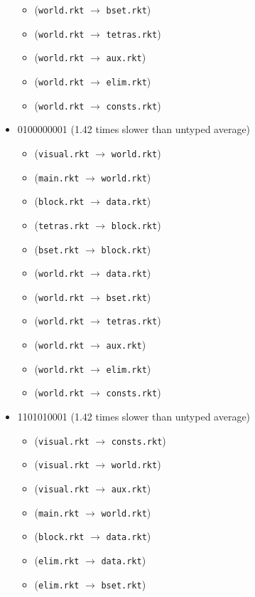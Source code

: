 \documentclass{article}
\newcommand{\mono}[1]{\texttt{#1}}
\begin{document}
\begin{itemize}
\begin{itemize}
  \item (\mono{world.rkt} $\rightarrow$ \mono{bset.rkt})
  \item (\mono{world.rkt} $\rightarrow$ \mono{tetras.rkt})
  \item (\mono{world.rkt} $\rightarrow$ \mono{aux.rkt})
  \item (\mono{world.rkt} $\rightarrow$ \mono{elim.rkt})
  \item (\mono{world.rkt} $\rightarrow$ \mono{consts.rkt})
  \end{itemize}
\item 0100000001 (1.42 times slower than untyped average)
  \begin{itemize}
  \item (\mono{visual.rkt} $\rightarrow$ \mono{world.rkt})
  \item (\mono{main.rkt} $\rightarrow$ \mono{world.rkt})
  \item (\mono{block.rkt} $\rightarrow$ \mono{data.rkt})
  \item (\mono{tetras.rkt} $\rightarrow$ \mono{block.rkt})
  \item (\mono{bset.rkt} $\rightarrow$ \mono{block.rkt})
  \item (\mono{world.rkt} $\rightarrow$ \mono{data.rkt})
  \item (\mono{world.rkt} $\rightarrow$ \mono{bset.rkt})
  \item (\mono{world.rkt} $\rightarrow$ \mono{tetras.rkt})
  \item (\mono{world.rkt} $\rightarrow$ \mono{aux.rkt})
  \item (\mono{world.rkt} $\rightarrow$ \mono{elim.rkt})
  \item (\mono{world.rkt} $\rightarrow$ \mono{consts.rkt})
  \end{itemize}
\item 1101010001 (1.42 times slower than untyped average)
  \begin{itemize}
  \item (\mono{visual.rkt} $\rightarrow$ \mono{consts.rkt})
  \item (\mono{visual.rkt} $\rightarrow$ \mono{world.rkt})
  \item (\mono{visual.rkt} $\rightarrow$ \mono{aux.rkt})
  \item (\mono{main.rkt} $\rightarrow$ \mono{world.rkt})
  \item (\mono{block.rkt} $\rightarrow$ \mono{data.rkt})
  \item (\mono{elim.rkt} $\rightarrow$ \mono{data.rkt})
  \item (\mono{elim.rkt} $\rightarrow$ \mono{bset.rkt})

\end{itemize}
\end{itemize}
\end{document}
